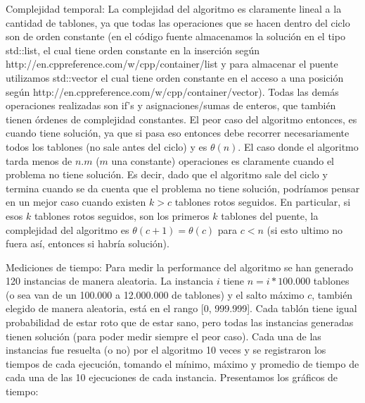 \documentclass{article}
\begin{document}
\vspace{1.5cm}
{\noindent \Huge Complejidad temporal:}
\newline \newline
La complejidad del algoritmo es claramente lineal a la cantidad de tablones, ya que todas las operaciones que se hacen dentro del ciclo son de orden constante (en el c\'odigo fuente almacenamos la soluci\'on en el tipo std::list, el cual tiene orden constante en la inserci\'on seg\'un http://en.cppreference.com/w/cpp/container/list y para almacenar el puente utilizamos std::vector el cual tiene orden constante en el acceso a una posici\'on seg\'un http://en.cppreference.com/w/cpp/container/vector). Todas las dem\'as operaciones realizadas son if's y asignaciones/sumas de enteros, que tambi\'en tienen \'ordenes de complejidad constantes.
\newline El peor caso del algoritmo entonces, es cuando tiene soluci\'on, ya que si pasa eso entonces debe recorrer necesariamente todos los tablones (no sale antes del ciclo) y es $\theta (n)$.
\newline El caso donde el algoritmo tarda menos de $n.m$ ($m$ una constante) operaciones es claramente cuando el problema no tiene soluci\'on. Es decir, dado que el algoritmo sale del ciclo y termina cuando se da cuenta que el problema no tiene soluci\'on, podr\'iamos pensar en un mejor caso cuando existen $k > c$ tablones rotos seguidos. En particular, si esos $k$ tablones rotos seguidos, son los primeros $k$ tablones del puente, la complejidad del algoritmo es $\theta(c + 1) = \theta(c)$ para $c < n$ (si esto ultimo no fuera as\'i, entonces si habr\'ia soluci\'on).

\vspace{0.6cm}
{\noindent \Huge Mediciones de tiempo:}
\newline \newline Para medir la performance del algoritmo se han generado 120 instancias de manera aleatoria. La instancia $i$ tiene $n = i * 100.000$ tablones (o sea van de un 100.000 a 12.000.000 de tablones) y el salto m\'aximo $c$, tambi\'en elegido de manera aleatoria, est\'a en el rango [0, 999.999].
\newline Cada tabl\'on tiene igual probabilidad de estar roto que de estar sano, pero todas las instancias generadas tienen soluci\'on (para poder medir siempre el peor caso).
\newline Cada una de las instancias fue resuelta (o no) por el algoritmo 10 veces y se registraron los tiempos de cada ejecuci\'on, tomando el m\'inimo, m\'aximo y promedio de tiempo de cada una de las 10 ejecuciones de cada instancia.
\newline \newline Presentamos los gr\'aficos de tiempo:
\end{document}
